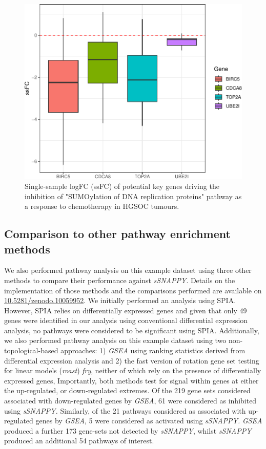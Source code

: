 \documentclass[9pt,a4paper,]{extarticle}
\begin{document}
\begin{figure}

{\centering \includegraphics[width=0.8\linewidth]{sSNAPPY_paper_files/figure-latex/Figure8-1} 

}

\caption{Single-sample logFC (ssFC) of potential key genes driving the inhibition of "SUMOylation of DNA replication proteins" pathway as a response to chemotherapy in HGSOC tumours.}\label{fig:Figure8}
\end{figure}

\hypertarget{comparison-to-other-pathway-enrichment-methods}{%
\subsection{Comparison to other pathway enrichment methods}\label{comparison-to-other-pathway-enrichment-methods}}

We also performed pathway analysis on this example dataset using three other methods to compare their performance against \emph{sSNAPPY}.
Details on the implementation of those methods and the comparisons performed are available on \href{https://zenodo.org/doi/10.5281/zenodo.10059951}{10.5281/zenodo.10059952}.
We initially performed an analysis using SPIA\citep{Tarca2009}.
However, SPIA relies on differentially expressed genes and given that only 49 genes were identified in our analysis using conventional differential expression analysis, no pathways were considered to be significant using SPIA.
Additionally, we also performed pathway analysis on this example dataset using two non-topological-based approaches: 1) \emph{GSEA}\citep{Subramanian2005-lx} using ranking statistics derived from differential expression analysis and 2) the fast version of rotation gene set testing for linear models (\emph{roast})\citep{wu2010roast} \emph{fry}, neither of which rely on the presence of differentially expressed genes,
Importantly, both methods test for signal within genes at either the up-regulated, or down-regulated extremes.
Of the 219 gene sets considered associated with down-regulated genes by \emph{GSEA}, 61 were considered as inhibited using \emph{sSNAPPY.}
Similarly, of the 21 pathways considered as associated with up-regulated genes by \emph{GSEA}, 5 were considered as activated using \emph{sSNAPPY.}
\emph{GSEA} produced a further 173 gene-sets not detected by \emph{sSNAPPY}, whilst \emph{sSNAPPY} produced an additional 54 pathways of interest.
\end{document}
